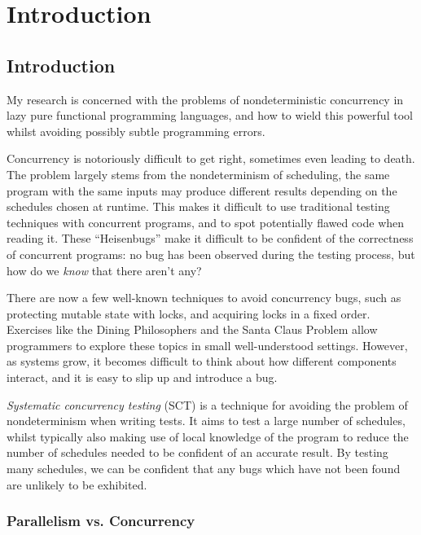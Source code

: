 \part{Introduction}
\chapter{Introduction}
\label{chp:intro}


My research is concerned with the problems of nondeterministic
concurrency in lazy pure functional programming languages, and how to
wield this powerful tool whilst avoiding possibly subtle programming
errors.

Concurrency is notoriously difficult to get right\cite{overrated},
sometimes even leading to death\cite{therac25}. The problem largely
stems from the nondeterminism of scheduling, the same program with the
same inputs may produce different results depending on the schedules
chosen at runtime. This makes it difficult to use traditional testing
techniques with concurrent programs, and to spot potentially flawed
code when reading it. These ``Heisenbugs'' make it difficult to be
confident of the correctness of concurrent programs: no bug has been
observed during the testing process, but how do we \textit{know} that
there aren't any?

There are now a few well-known techniques to avoid concurrency bugs,
such as protecting mutable state with locks, and acquiring locks in a
fixed order. Exercises like the Dining
Philosophers\cite{diningphilosophers} and the Santa Claus
Problem\cite{santaclaus} allow programmers to explore these topics in
small well-understood settings. However, as systems grow, it becomes
difficult to think about how different components interact, and it is
easy to slip up and introduce a bug.

\textit{Systematic concurrency testing} (SCT)\cite{pbound, dbound,
  empirical, heisenbugs} is a technique for avoiding the problem of
nondeterminism when writing tests. It aims to test a large number of
schedules, whilst typically also making use of local knowledge of the
program to reduce the number of schedules needed to be confident of an
accurate result. By testing many schedules, we can be confident that
any bugs which have not been found are unlikely to be exhibited.

\section{Parallelism vs. Concurrency}
\label{sec:intro-parconc}

